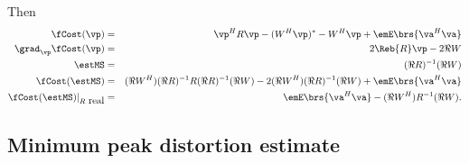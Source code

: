 Then
\begin{eqnarray*}
   \fCost(\vp)           &=& \vp^H R \vp - (W^H\vp)^\ast -W^H\vp + \emE\brs{\va^H\va} \\
   \grad_\vp \fCost(\vp) &=& 2\Reb{R}\vp - 2\Re{W}  \\
   \estMS                  &=& (\Re{R})^{-1}(\Re{W})  \\
   \fCost(\estMS)        &=&    (\Re{W^H})(\Re{R})^{-1} R (\Re{R})^{-1}(\Re{W}) - 2(\Re{W^H})(\Re{R})^{-1}(\Re{W}) + \emE\brs{\va^H\va} \\
   \fCost(\estMS)|_{R\mbox{ real}} &=&    \emE\brs{\va^H\va} - (\Re{W^H})R^{-1}(\Re{W}).
\end{eqnarray*}



\subsection{Minimum peak distortion estimate}
\label{sec:eq_pd}
